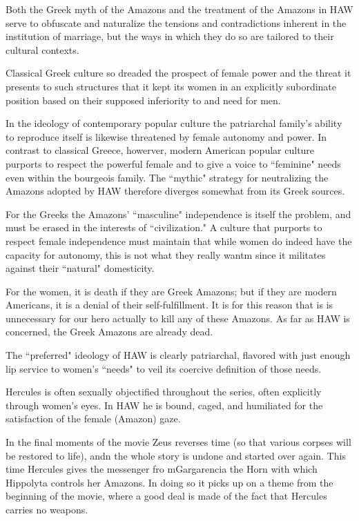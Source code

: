 Both the Greek myth of the Amazons and the treatment of the Amazons in HAW serve to obfuscate and naturalize the tensions and contradictions inherent in the institution of marriage, but the ways in which they do so are tailored to their cultural contexts.

\begin{rmk}
    Classical Greek culture so dreaded the prospect of female power and the threat it presents to such structures that it kept its women in an explicitly subordinate position based on their supposed inferiority to and need for men.
\end{rmk}

In the ideology of contemporary popular culture the patriarchal family's ability to reproduce itself is likewise threatened by female autonomy and power. In contrast to classical Greece, howerver, modern American popular culture purports to respect the powerful female and to give a voice to ``feminine" needs even within the bourgeois family. The ``mythic" strategy for neutralizing the Amazons adopted by HAW therefore diverges somewhat from its Greek sources.

For the Greeks the Amazons' ``masculine" independence is itself the problem, and must be erased in the interests of ``civilization." A culture that purports to respect female independence must maintain that while women do indeed have the capacity for autonomy, this is not what they really wantm since it militates against their ``natural" domesticity.

\begin{rmk}
    For the women, it is death if they are Greek Amazons; but if they are modern Americans, it is a denial of their self-fulfillment. It is for this reason that is is unnecessary for our hero actually to kill any of these Amazons. As far as HAW is concerned, the Greek Amazons are already dead.
\end{rmk}

The ``preferred" ideology of HAW is clearly patriarchal, flavored with just enough lip service to women's ``needs" to veil its coercive definition of those needs.  

Hercules is often sexually objectified throughout the series, often explicitly through women's eyes. In HAW he is bound, caged, and humiliated for the satisfaction of the female (Amazon) gaze.

In the final moments of the movie Zeus reverses time (so that various corpses will be restored to life), andn the whole story is undone and started over again. This time Hercules gives the messenger fro mGargarencia the Horn with which Hippolyta controls her Amazons. In doing so it picks up on a theme from the beginning of the movie, where a good deal is made of the fact that Hercules carries no weapons.

